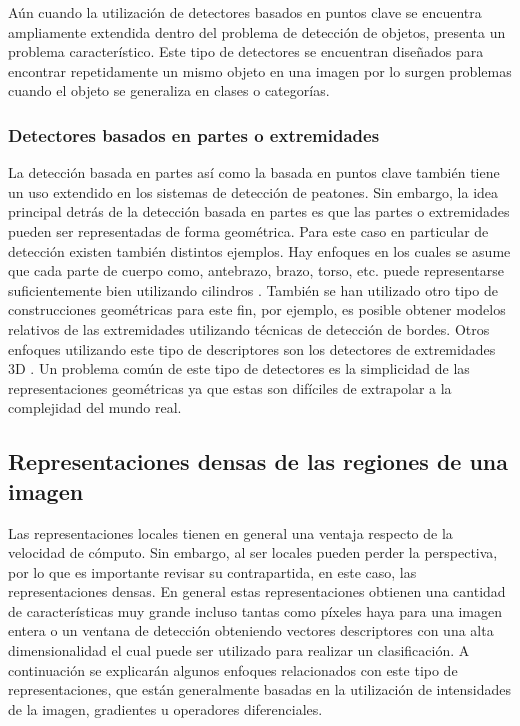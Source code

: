 Aún cuando la utilización de detectores basados en puntos clave se encuentra ampliamente extendida dentro del problema de detección de objetos, presenta un problema característico. Este tipo de detectores se encuentran diseñados para encontrar repetidamente un mismo objeto en una imagen por lo surgen problemas cuando el objeto se generaliza en clases o categorías.


\subsubsection{Detectores basados en partes o extremidades}

La detección basada en partes así como la basada en puntos clave también tiene un uso extendido en los sistemas de detección de peatones. Sin embargo, la idea principal detrás de la detección basada en partes es que las partes o extremidades pueden ser representadas de forma geométrica. Para este caso en particular de detección existen también distintos ejemplos. Hay enfoques en los cuales se asume que cada parte de cuerpo como, antebrazo, brazo, torso, etc.  puede representarse suficientemente bien utilizando cilindros \citep{Ramanan2003}. También se han  utilizado otro tipo de construcciones geométricas para este fin, por ejemplo, es posible obtener modelos relativos de las extremidades utilizando técnicas de detección de bordes. Otros enfoques utilizando este tipo de descriptores son los detectores de extremidades 3D \citep{Sigal2003}. Un problema común de este tipo de detectores es la simplicidad de las representaciones geométricas ya que estas son difíciles de extrapolar a la complejidad del mundo real. 


\subsection{Representaciones densas de las regiones de una imagen}
\label{caract:densas}

Las representaciones locales tienen en general una ventaja respecto de la velocidad de cómputo. Sin embargo, al ser locales pueden perder la perspectiva, por lo que es importante revisar su contrapartida, en este caso, las representaciones densas. En general estas representaciones obtienen una cantidad de características muy grande incluso tantas como píxeles haya para una imagen entera o un ventana de detección obteniendo vectores descriptores con una alta dimensionalidad el cual puede ser utilizado para realizar un clasificación. 
A continuación se explicarán algunos enfoques relacionados con este tipo de representaciones, que están generalmente basadas en la utilización de intensidades de la imagen, gradientes u operadores diferenciales.

